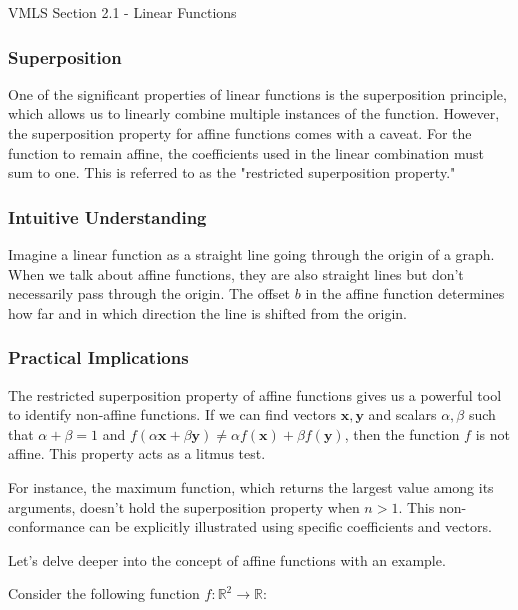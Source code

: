 \begin{notes}{VMLS Section 2.1 - Linear Functions}
    \subsubsection*{Superposition}
    One of the significant properties of linear functions is the superposition principle, which allows us to linearly combine multiple instances of the function. However, the superposition property for affine functions comes with a 
    caveat. For the function to remain affine, the coefficients used in the linear combination must sum to one. This is referred to as the "restricted superposition property."
    
    \subsubsection*{Intuitive Understanding}
    Imagine a linear function as a straight line going through the origin of a graph. When we talk about affine functions, they are also straight lines but don't necessarily pass through the origin. The offset \( b \) in the affine 
    function determines how far and in which direction the line is shifted from the origin.
    
    \subsubsection*{Practical Implications}
    The restricted superposition property of affine functions gives us a powerful tool to identify non-affine functions. If we can find vectors \( \mathbf{x}, \mathbf{y} \) and scalars \( \alpha, \beta \) such that \( \alpha + \beta 
    = 1 \) and \( f(\alpha \mathbf{x} + \beta \mathbf{y}) \neq \alpha f(\mathbf{x}) + \beta f(\mathbf{y}) \), then the function \( f \) is not affine. This property acts as a litmus test.
    
    For instance, the maximum function, which returns the largest value among its arguments, doesn't hold the superposition property when \( n > 1 \). This non-conformance can be explicitly illustrated using specific coefficients and 
    vectors.
    
    \begin{highlight}
        Let's delve deeper into the concept of affine functions with an example. \vspace*{1em}

        
        Consider the following function \( f: \mathbb{R}^2 \rightarrow \mathbb{R} \):
        

\end{highlight}
\end{notes}

